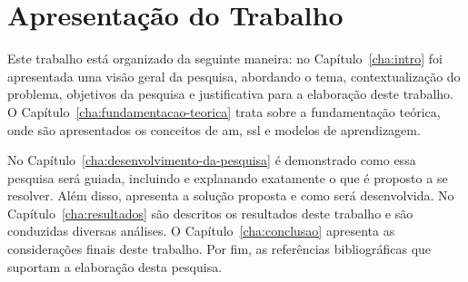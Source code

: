 \section{Apresentação do Trabalho}
    \label{sec:apresentacao-trabalho}
    Este trabalho está organizado da seguinte maneira: no Capítulo~\ref{cha:intro} foi apresentada uma visão geral da pesquisa, abordando o tema, contextualização do problema, objetivos da pesquisa e justificativa para a elaboração deste trabalho. O Capítulo~\ref{cha:fundamentacao-teorica} trata sobre a fundamentação teórica, onde são apresentados os conceitos de \ac{am}, \ac{ssl} e modelos de aprendizagem.
    
    No Capítulo~\ref{cha:desenvolvimento-da-pesquisa} é demonstrado como essa pesquisa será guiada, incluindo e explanando exatamente o que é proposto a se resolver. Além disso, apresenta a solução proposta e como será desenvolvida. No Capítulo~\ref{cha:resultados} são descritos os resultados deste trabalho e são conduzidas diversas análises. O Capítulo~\ref{cha:conclusao} apresenta as considerações finais deste trabalho. Por fim, as referências bibliográficas que suportam a elaboração desta pesquisa.